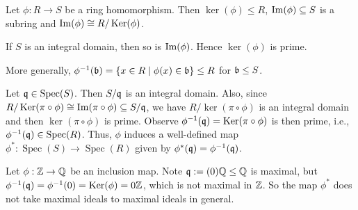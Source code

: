 \begin{fact}
    Let $\phi: R \to S$ be a ring homomorphism. Then $\ker(\phi) \leq R$, $\operatorname{Im}(\phi) \subseteq S$ is a subring and $\operatorname{Im}(\phi) \cong R/\operatorname{Ker}(\phi)$. \par 
    If $S$ is an integral domain, then so is $\operatorname{Im}(\phi)$. Hence $\ker(\phi)$ is prime. \par
    More generally, $\phi^{-1}(\mathfrak{b}) = \{x \in R \mid \phi(x) \in \mathfrak{b}\} \leq R$ for $\mathfrak{b} \leq S$.
    \begin{center}
    \end{center}
    \par
    Let $\mathfrak{q} \in \operatorname{Spec}(S)$. Then $S/\mathfrak{q}$ is an integral domain. Also, since $R/\operatorname{Ker}(\pi \circ \phi) \cong \operatorname{Im}(\pi \circ \phi) \subseteq S/\mathfrak{q}$, we have $R/\ker(\pi \circ \phi)$ is an integral domain and then $\ker(\pi \circ \phi)$ is prime. Observe $\phi^{-1}(\mathfrak{q}) = \operatorname{Ker}(\pi \circ \phi)$ is then prime, i.e., $\phi^{-1}(\mathfrak{q}) \in \operatorname{Spec}(R)$. Thus, $\phi$ induces a well-defined map $\phi^*: \operatorname{Spec}(S) \to \operatorname{Spec}(R)$ given by $\phi^*(\mathfrak{q}) = \phi^{-1}(\mathfrak{q})$.
    \end{fact}

\begin{example*}
    Let $\phi: \mathbb{Z} \to \mathbb{Q}$ be an inclusion map. Note $\mathfrak{q} := (0)\mathbb{Q} \leq \mathbb{Q}$ is maximal, but $\phi^{-1}(\mathfrak{q}) = \phi^{-1}(0) = \operatorname{Ker}(\phi) = 0 \mathbb{Z}$, which is not maximal in $\mathbb{Z}$. So the map $\phi^*$ does not take maximal ideals to maximal ideals in general.
\end{example*}

